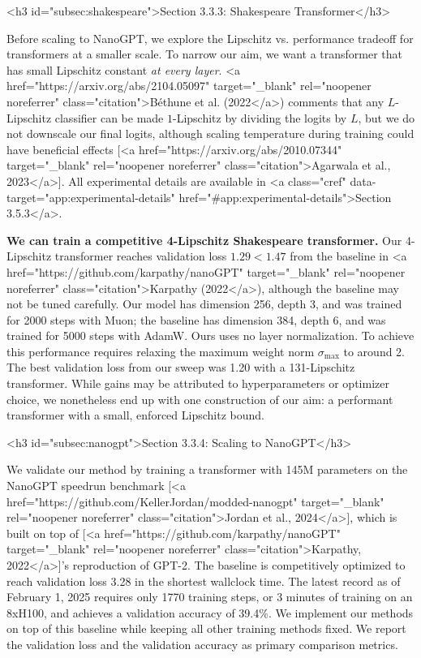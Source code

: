 <h3 id="subsec:shakespeare">Section 3.3.3: Shakespeare Transformer</h3>

Before scaling to NanoGPT, we explore the Lipschitz vs. performance tradeoff for transformers at a smaller scale. To narrow our aim, we want a transformer that has small Lipschitz constant \textit{at every layer}. <a href="https://arxiv.org/abs/2104.05097" target="_blank" rel="noopener noreferrer" class="citation">B{\'e}thune et al. (2022</a>) comments that any $L$-Lipschitz classifier can be made $1$-Lipschitz by dividing the logits by $L$, but we do not downscale our final logits, although scaling temperature during training could have beneficial effects [<a href="https://arxiv.org/abs/2010.07344" target="_blank" rel="noopener noreferrer" class="citation">Agarwala et al., 2023</a>]. All experimental details are available in <a class="cref" data-target="app:experimental-details" href="#app:experimental-details">Section 3.5.3</a>.

\textbf{We can train a competitive 4-Lipschitz Shakespeare transformer.} Our 4-Lipschitz transformer reaches validation loss $1.29 < 1.47$ from the baseline in <a href="https://github.com/karpathy/nanoGPT" target="_blank" rel="noopener noreferrer" class="citation">Karpathy (2022</a>), although the baseline may not be tuned carefully. Our model has dimension 256, depth 3, and was trained for 2000 steps with Muon; the baseline has dimension 384, depth 6, and was trained for 5000 steps with AdamW. Ours uses no layer normalization. To achieve this performance requires relaxing the maximum weight norm $\sigma_\text{max}$ to around 2. The best validation loss from our sweep was 1.20 with a 131-Lipschitz transformer. While gains may be attributed to hyperparameters or optimizer choice, we nonetheless end up with one construction of our aim: a performant transformer with a small, enforced Lipschitz bound.

<h3 id="subsec:nanogpt">Section 3.3.4: Scaling to NanoGPT</h3>

We validate our method by training a transformer with 145M parameters on the NanoGPT speedrun benchmark [<a href="https://github.com/KellerJordan/modded-nanogpt" target="_blank" rel="noopener noreferrer" class="citation">Jordan et al., 2024</a>], which is built on top of [<a href="https://github.com/karpathy/nanoGPT" target="_blank" rel="noopener noreferrer" class="citation">Karpathy, 2022</a>]'s reproduction of GPT-2. The baseline is competitively optimized to reach validation loss 3.28 in the shortest wallclock time. The latest record as of February 1, 2025 requires only 1770 training steps, or 3 minutes of training on an 8xH100, and achieves a validation accuracy of 39.4\%. We implement our methods on top of this baseline while keeping all other training methods fixed. We report the validation loss and the validation accuracy as primary comparison metrics.

